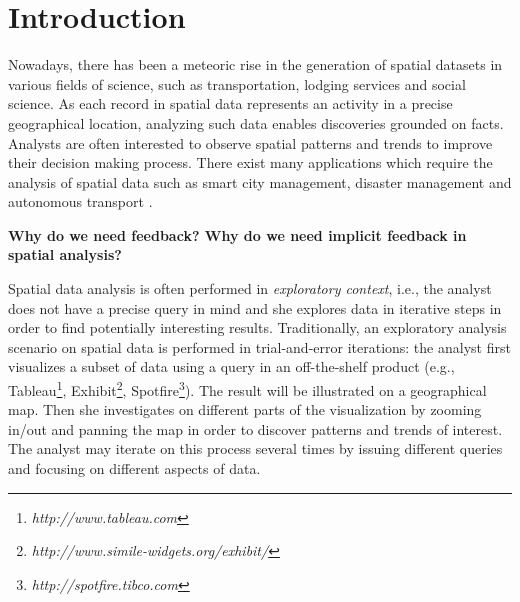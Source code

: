 \documentclass[runningheads,a4paper]{llncs}
\newcommand{\sgg}{{\sc PolyGuide}}
\newcommand{\geoguide}{{\sc GeoGuide}}
\newcommand{\keywords}[1]{\par\addvspace\baselineskip
\noindent\keywordname\enspace\ignorespaces#1}
\begin{document}
\begin{abstract}
In this paper we present a solution to capture region preferences from implicit feedbacks. Given a point from a spatial dataset, a set of regions captured from gaze and mouse tracking, the set of region intersections, the \sgg\ captures the implicit feedback of analysts and exploits it to highlight potentially interesting options. The analysis consider the concept of relevance and diversity of a given point with the others in the same data set, from the regions tracked during the analysis.  To tackle this challenge, we extend \geoguide \cite{Omidvar:2017} approach by using ST-DBSCAN\cite{Birant:2007} algorithm to map the region preferences from implicit tracking over time. We capture, analyse, generate and save region preferences in order to highlight informations, from any spatial dataset that can be useful to the analyst. So, this work aims to answers questions about interactivity and guidance in spatial solutions. We evaluate the efficiency of the proposed approach experimentally considering spatial datasets.

\keywords{\sgg, ST-DBSCAN, mouse-tracking, implicit preferences, regions}
\end{abstract}


\section{Introduction}

Nowadays, there has been a meteoric rise in the generation of spatial datasets in various fields of science, such as transportation, lodging services and social science. As each record in spatial data represents an activity in a precise geographical location, analyzing such data enables discoveries grounded on facts. Analysts are often interested to observe spatial patterns and trends to improve their decision making process. There exist many applications which require the analysis of spatial data such as smart city management, disaster management and autonomous transport \cite{RoddickEHPS04,Telang:2012}.

\vspace{3pt}
{\bf Why do we need feedback? Why do we need implicit feedback in spatial analysis?}

\vspace{3pt}
Spatial data analysis is often performed in {\em exploratory context}, i.e., the analyst does not have a precise query in mind and she explores data in iterative steps in order to find potentially interesting results. Traditionally, an exploratory analysis scenario on spatial data is performed in trial-and-error iterations: the analyst first visualizes a subset of data using a query in an off-the-shelf product (e.g., Tableau\footnote{\it http://www.tableau.com}, Exhibit\footnote{\it http://www.simile-widgets.org/exhibit/}, Spotfire\footnote{\it http://spotfire.tibco.com}). The result will be illustrated on a geographical map. Then she investigates on different parts of the visualization by zooming in/out and panning the map in order to discover patterns and trends of interest. The analyst may iterate on this process several times by issuing different queries and focusing on different aspects of data.
\end{document}
